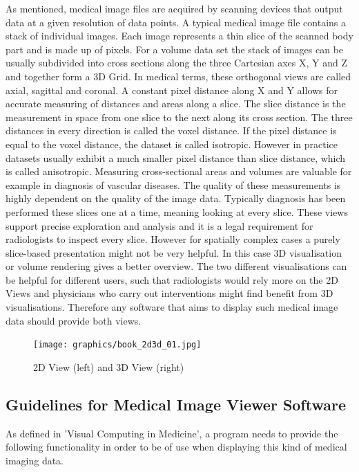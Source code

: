 \documentclass[a4paper,11pt,titlepage]{article}
\begin{document}
As mentioned, medical image files are acquired by scanning devices that output data at a given resolution of data points. A typical medical image file contains a stack of individual images. Each image represents a thin slice of the scanned body part and is made up of pixels. For a volume data set the stack of images can be usually subdivided into cross sections along the three Cartesian axes X, Y and Z and together form a 3D Grid. In medical terms, these orthogonal views are called axial, sagittal and coronal. A constant pixel distance along X and Y allows for accurate measuring of distances and areas along a slice. The slice distance is the measurement in space from one slice to the next along its cross section. The three distances in every direction is called the voxel distance. If the pixel distance is equal to the voxel distance, the dataset is called isotropic. However in practice datasets usually exhibit a much smaller pixel distance than slice distance, which is called anisotropic.
Measuring cross-sectional areas and volumes are valuable for example in diagnosis of vascular diseases. The quality of these measurements is highly dependent on the quality of the image data. Typically diagnosis has been performed these slices one at a time, meaning looking at every slice. These views support precise exploration and analysis and it is a legal requirement for radiologists to inspect every slice. However for spatially complex cases a purely slice-based presentation might not be very helpful. In this case 3D visualisation or volume rendering gives a better overview. The two different visualisations can be helpful for different users, such that radiologists would rely more on the 2D Views and physicians who carry out interventions might find benefit from 3D visualisations. Therefore any software that aims to display such medical image data should provide both views.

\begin{figure}[ht!]
\centering
\texttt{[image: graphics/book\_2d3d\_01.jpg]}
\caption{2D View (left) and 3D View (right)}
\label{fig:UIdesign1}
\end{figure}

\subsection{Guidelines for Medical Image Viewer Software}

As defined in 'Visual Computing in Medicine'\cite{book}, a program needs to provide the following functionality in order to be of use when displaying this kind of medical imaging data. 
\end{document}

